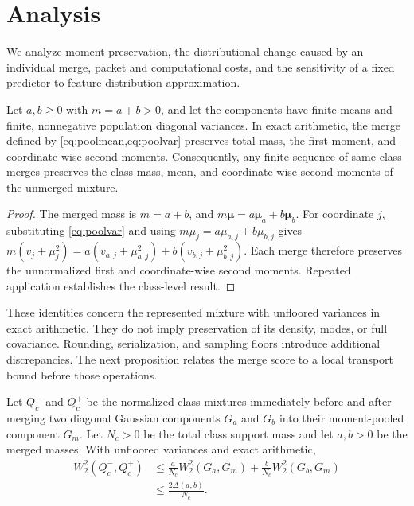 \section{Analysis}
\label{sec:analysis}

We analyze moment preservation, the distributional change caused by an individual merge, packet and computational costs, and the sensitivity of a fixed predictor to feature-distribution approximation.

\begin{proposition}
\label{prop:moments}
Let $a,b\geq0$ with $m=a+b>0$, and let the components have finite means and finite, nonnegative population diagonal variances. In exact arithmetic, the merge defined by \cref{eq:poolmean,eq:poolvar} preserves total mass, the first moment, and coordinate-wise second moments. Consequently, any finite sequence of same-class merges preserves the class mass, mean, and coordinate-wise second moments of the unmerged mixture.
\end{proposition}

\begin{proof}
The merged mass is $m=a+b$, and $m\bm\mu=a\bm\mu_a+b\bm\mu_b$. For coordinate $j$, substituting \cref{eq:poolvar} and using $m\mu_j=a\mu_{a,j}+b\mu_{b,j}$ gives
$
m(v_j+\mu_j^2)
=
a(v_{a,j}+\mu_{a,j}^2)
+
b(v_{b,j}+\mu_{b,j}^2).
$
Each merge therefore preserves the unnormalized first and coordinate-wise second moments. Repeated application establishes the class-level result.
\end{proof}

These identities concern the represented mixture with unfloored variances in exact arithmetic. They do not imply preservation of its density, modes, or full covariance. Rounding, serialization, and sampling floors introduce additional discrepancies. The next proposition relates the merge score to a local transport bound before those operations.

\begin{proposition}
\label{prop:merge_transport}
Let $Q_c^-$ and $Q_c^+$ be the normalized class mixtures immediately before and after merging two diagonal Gaussian components $G_a$ and $G_b$ into their moment-pooled component $G_m$. Let $N_c>0$ be the total class support mass and let $a,b>0$ be the merged masses. With unfloored variances and exact arithmetic,
\begin{equation}
\label{eq:merge_transport}
\begin{aligned}
W_2^2(Q_c^-,Q_c^+)
&\leq
\frac{a}{N_c}W_2^2(G_a,G_m)+
\frac{b}{N_c}W_2^2(G_b,G_m)\\
&\leq
\frac{2\Delta(a,b)}{N_c}.
\end{aligned}
\end{equation}
\end{proposition}

